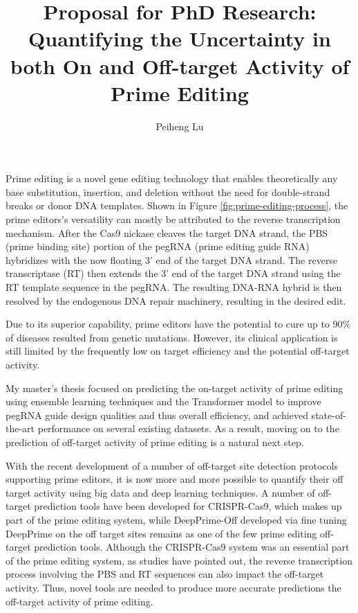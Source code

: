 \documentclass[a4,12pt]{article}
\title{Proposal for PhD Research: 
Quantifying the Uncertainty in both On and Off-target Activity of Prime Editing}
\author{Peiheng Lu}
\begin{document}
\maketitle

Prime editing is a novel gene editing technology that enables theoretically any base substitution, insertion, and deletion without the need for double-strand breaks or donor DNA templates\cite{liudavidr.SearchreplaceGenomeEditing2019,liuPrimeEditingPrecise2023}. Shown in Figure \ref{fig:prime-editing-process}, the prime editors's versatility can mostly be attributed to the reverse transcription mechanism. After the Cas9 nickase cleaves the target DNA strand, the PBS (prime binding site) portion of the pegRNA (prime editing guide RNA) hybridizes with the now floating 3' end of the target DNA strand. The reverse transcriptase (RT) then extends the 3' end of the target DNA strand using the RT template sequence in the pegRNA. The resulting DNA-RNA hybrid is then resolved by the endogenous DNA repair machinery, resulting in the desired edit.

Due to its superior capability, prime editors have the potential to cure up to 90\% of diseases resulted from genetic mutations\cite{kantorCRISPRCas9DNABaseEditing2020}. However, its clinical application is still limited by the frequently low on target efficiency and the potential off-target activity\cite{zhaoPrimeEditingAdvances2023}.

My master's thesis focused on predicting the on-target activity of prime editing using ensemble learning techniques and the Transformer model to improve pegRNA guide design qualities and thus overall efficiency, and achieved state-of-the-art performance on several existing datasets. As a result, moving on to the prediction of off-target activity of prime editing is a natural next step.

With the recent development of a number of off-target site detection protocols supporting prime editors, it is now more and more possible to quantify their off target activity using big data and deep learning techniques\parencite{liangGenomewideProfilingPrime2023,
zhuTrackingseqRevealsHeterogeneity2024}.
A number of off-target prediction tools have been developed for CRISPR-Cas9, which makes up part of the prime editing system, while DeepPrime-Off developed via fine tuning DeepPrime on the off target sites remains as one of the few prime editing off-target prediction tools. Although the CRISPR-Cas9 system was an essential part of the prime editing system, as studies have pointed out, the reverse transcription process involving the PBS and RT sequences can also impact the off-target activity. Thus, novel tools are needed to produce more accurate predictions the off-target activity of prime editing\parencite{liangGenomewideProfilingPrime2023,yuPredictionEfficienciesDiverse2023}.
\end{document}
